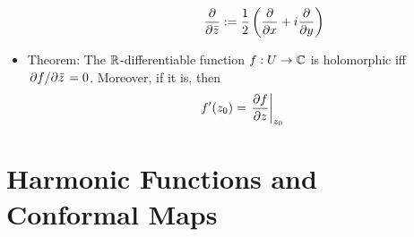 \documentclass[../notes.tex]{subfiles}
\begin{document}
\begin{itemize}
\begin{itemize}
\begin{itemize}
            \begin{equation*}
                \pdv{\bar{z}} := \frac{1}{2}\left( \pdv{x}+i\pdv{y} \right)
            \end{equation*}
        \end{itemize}
    \end{itemize}
    \item Theorem: The $\mathbb{R}$-differentiable function $f:U\to\mathbb{C}$ is holomorphic iff $\pdv*{f}{\bar{z}}=0$. Moreover, if it is, then
    \begin{equation*}
        f'(z_0) = \eval{\pdv{f}{z}}_{z_0}
    \end{equation*}
\end{itemize}



\section{Harmonic Functions and Conformal Maps}
\end{document}
